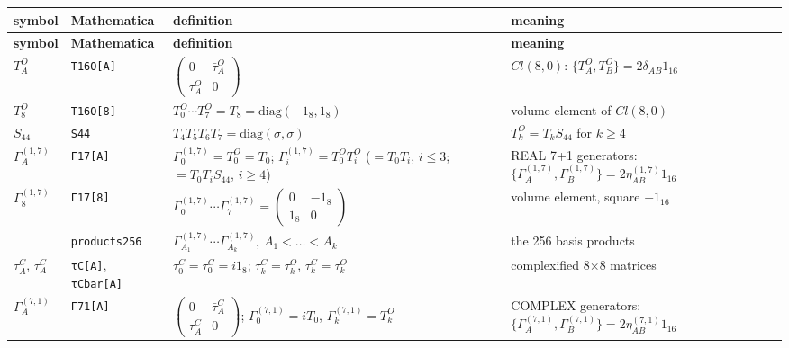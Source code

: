 \documentclass[10pt,a4paper]{article}
\begin{document}
{\footnotesize
\begin{longtable}{>{\raggedright\arraybackslash}p{}>{\raggedright\arraybackslash}p{}>{\raggedright\arraybackslash}p{}>{\raggedright\arraybackslash}p{}}
\toprule
\textbf{symbol} & \textbf{Mathematica} & \textbf{definition} & \textbf{meaning} \\
\midrule\endfirsthead
\toprule
\textbf{symbol} & \textbf{Mathematica} & \textbf{definition} & \textbf{meaning} \\
\midrule\endhead
\endfoot
\bottomrule\endlastfoot
$T^{O}_A$ & \texttt{T16O[A]} & $\left(\begin{smallmatrix}0&\bar\tau^{O}_A\\\tau^{O}_A&0\end{smallmatrix}\right)$ & $Cl(8,0)$: $\lbrace T^{O}_A,T^{O}_B\rbrace=2\delta_{AB}1_{16}$ \\
$T^{O}_8$ & \texttt{T16O[8]} & $T^{O}_0\cdots T^{O}_7=T_8=\mathrm{diag}(-1_8,1_8)$ & volume element of $Cl(8,0)$ \\
$S_{44}$ & \texttt{S44} & $T_4T_5T_6T_7=\mathrm{diag}(\sigma,\sigma)$ & $T^{O}_k=T_kS_{44}$ for $k\ge4$ \\
$\Gamma^{(1,7)}_A$ & \texttt{Γ17[A]} & $\Gamma^{(1,7)}_0=T^{O}_0=T_0$; $\Gamma^{(1,7)}_i=T^{O}_0T^{O}_i$ ($=T_0T_i$, $i\le3$; $=T_0T_iS_{44}$, $i\ge4$) & REAL 7+1 generators: $\lbrace\Gamma^{(1,7)}_A,\Gamma^{(1,7)}_B\rbrace=2\eta^{(1,7)}_{AB}1_{16}$ \\
$\Gamma^{(1,7)}_8$ & \texttt{Γ17[8]} & $\Gamma^{(1,7)}_0\cdots\Gamma^{(1,7)}_7=\left(\begin{smallmatrix}0&-1_8\\1_8&0\end{smallmatrix}\right)$ & volume element, square $-1_{16}$ \\
 & \texttt{products256} & $\Gamma^{(1,7)}_{A_1}\cdots\Gamma^{(1,7)}_{A_k}$, $A_1<\dots<A_k$ & the 256 basis products \\
$\tau^{C}_A$, $\bar\tau^{C}_A$ & \texttt{τC[A]}, \texttt{τCbar[A]} & $\tau^{C}_0=\bar\tau^{C}_0=i1_8$; $\tau^{C}_k=\tau^{O}_k$, $\bar\tau^{C}_k=\bar\tau^{O}_k$ & complexified 8×8 matrices \\
$\Gamma^{(7,1)}_A$ & \texttt{Γ71[A]} & $\left(\begin{smallmatrix}0&\bar\tau^{C}_A\\\tau^{C}_A&0\end{smallmatrix}\right)$; $\Gamma^{(7,1)}_0=iT_0$, $\Gamma^{(7,1)}_k=T^{O}_k$ & COMPLEX generators: $\lbrace\Gamma^{(7,1)}_A,\Gamma^{(7,1)}_B\rbrace=2\eta^{(7,1)}_{AB}1_{16}$ \\

\end{longtable}}
\end{document}

